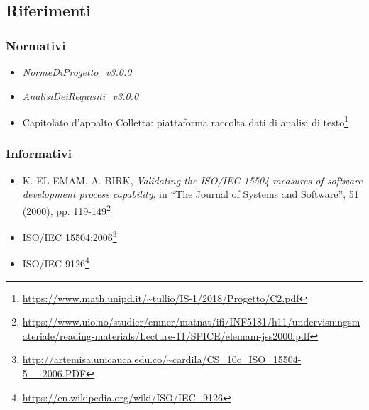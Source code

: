 \subsection{Riferimenti}
\subsubsection{Normativi}
\begin{itemize}
\item \textit{NormeDiProgetto\_v3.0.0}
\item \textit{AnalisiDeiRequisiti\_v3.0.0}
\item Capitolato d'appalto Colletta: piattaforma raccolta dati di analisi di testo\footnote{\url{https://www.math.unipd.it/~tullio/IS-1/2018/Progetto/C2.pdf}}
\end{itemize}
\subsubsection{Informativi}
\begin{itemize}
	\item K. EL EMAM, A. BIRK, \textit{Validating the ISO/IEC 15504 measures of software development process capability}, in \enquote{The Journal of Systems and Software}, 51 (2000), pp. 119-149\footnote{\url{https://www.uio.no/studier/emner/matnat/ifi/INF5181/h11/undervisningsmateriale/reading-materials/Lecture-11/SPICE/elemam-jss2000.pdf}}
	\item ISO/IEC 15504:2006\footnote{\url{http://artemisa.unicauca.edu.co/~cardila/CS\_10c\_ISO\_15504-5\_\_2006.PDF}}
	\item ISO/IEC 9126\footnote{\url{https://en.wikipedia.org/wiki/ISO/IEC_9126}}
\end{itemize} 
